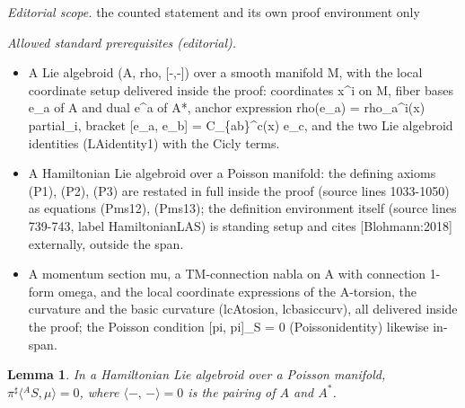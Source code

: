 \documentclass[10pt,a4paper]{article}
\numberwithin{equation}{section}
\newtheorem{Lemma}[Theorem]{Lemma}
\newcommand{\bracket}[2]{\langle #1,\,#2\rangle}
\begin{document}
\noindent\textit{Editorial scope.} the counted statement and its own proof environment only\par\medskip
\noindent\textit{Allowed standard prerequisites (editorial).}\begin{itemize}
\item A Lie algebroid (A, rho, [-,-]) over a smooth manifold M, with the local coordinate setup delivered inside the proof: coordinates x\textasciicircum{}i on M, fiber bases e\_a of A and dual e\textasciicircum{}a of A*, anchor expression rho(e\_a) = rho\_a\textasciicircum{}i(x) partial\_i, bracket [e\_a, e\_b] = C\_\{ab\}\textasciicircum{}c(x) e\_c, and the two Lie algebroid identities (LAidentity1) with the Cicly terms.
\item A Hamiltonian Lie algebroid over a Poisson manifold: the defining axioms (P1), (P2), (P3) are restated in full inside the proof (source lines 1033-1050) as equations (Pms12), (Pms13); the definition environment itself (source lines 739-743, label HamiltonianLAS) is standing setup and cites [Blohmann:2018] externally, outside the span.
\item A momentum section mu, a TM-connection nabla on A with connection 1-form omega, and the local coordinate expressions of the A-torsion, the curvature and the basic curvature (lcAtosion, lcbasiccurv), all delivered inside the proof; the Poisson condition [pi, pi]\_S = 0 (Poissonidentity) likewise in-span.
\end{itemize}\medskip
\begin{Lemma}\label{basicms}
In a Hamiltonian Lie algebroid over a Poisson manifold,
$\pi^{\sharp} \bigl\langle{}^A S,\mu\bigr\rangle =0$,
where $\bracket{-}{-} =0$ is the pairing of $A$ and $A^*$.
\end{Lemma}
\end{document}
